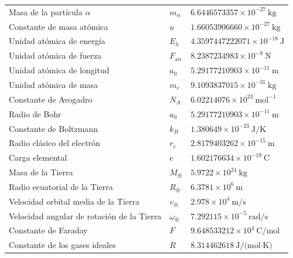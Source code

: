 \documentclass[12pt]{article}
\begin{document}
\begin{longtable}{p{} p{} p{}}
Masa de la partícula $\alpha$ & $m_\alpha$ & $6.6446573357 \times 10^{-27}\ \text{kg}$ \\
Constante de masa atómica & $u$ & $1.66053906660 \times 10^{-27}\ \text{kg}$ \\
Unidad atómica de energía & $E_h$ & $4.3597447222071 \times 10^{-18}\ \text{J}$ \\
Unidad atómica de fuerza & $F_{\text{au}}$ & $8.2387234983 \times 10^{-8}\ \text{N}$ \\
Unidad atómica de longitud & $a_0$ & $5.29177210903 \times 10^{-11}\ \text{m}$ \\
Unidad atómica de masa & $m_e$ & $9.1093837015 \times 10^{-31}\ \text{kg}$ \\
Constante de Avogadro & $N_A$ & $6.02214076 \times 10^{23}\ \text{mol}^{-1}$ \\
Radio de Bohr & $a_0$ & $5.29177210903 \times 10^{-11}\ \text{m}$ \\
Constante de Boltzmann & $k_B$ & $1.380649 \times 10^{-23}\ \text{J/K}$ \\
Radio clásico del electrón & $r_e$ & $2.8179403262 \times 10^{-15}\ \text{m}$ \\
Carga elemental & $e$ & $1.602176634 \times 10^{-19}\ \text{C}$ \\
Masa de la Tierra & $M_\oplus$ & $5.9722 \times 10^{24}\ \text{kg}$ \\
Radio ecuatorial de la Tierra & $R_\oplus$ & $6.3781 \times 10^{6}\ \text{m}$ \\
Velocidad orbital media de la Tierra & $v_\oplus$ & $2.978 \times 10^{4}\ \text{m/s}$ \\
Velocidad angular de rotación de la Tierra & $\omega_\oplus$ & $7.292115 \times 10^{-5}\ \text{rad/s}$ \\
Constante de Faraday & $F$ & $9.648533212 \times 10^{4}\ \text{C/mol}$ \\
Constante de los gases ideales & $R$ & $8.314462618 \ \text{J/(mol·K)}$ \\

\end{longtable}
\end{document}
